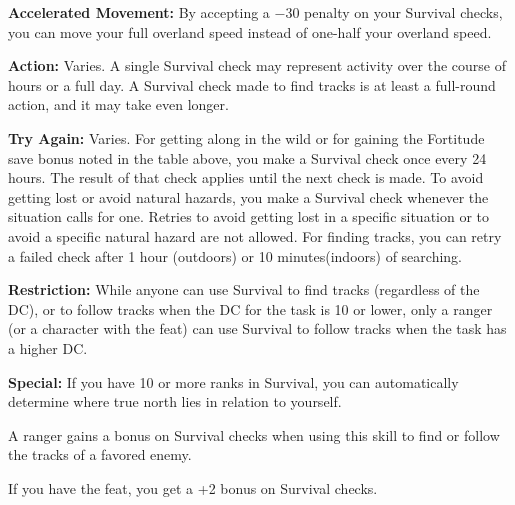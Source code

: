 
\textbf{Accelerated Movement:} By accepting a $-30$ penalty on your Survival checks, you can move your full overland speed instead of one-half your overland speed.

\textbf{Action:} Varies. A single Survival check may represent activity over the course of hours or a full day. A Survival check made to find tracks is at least a full-round action, and it may take even longer.

\textbf{Try Again:} Varies. For getting along in the wild or for gaining the Fortitude save bonus noted in the table above, you make a Survival check once every 24 hours. The result of that check applies until the next check is made. To avoid getting lost or avoid natural hazards, you make a Survival check whenever the situation calls for one. Retries to avoid getting lost in a specific situation or to avoid a specific natural hazard are not allowed. For finding tracks, you can retry a failed check after 1 hour (outdoors) or 10 minutes(indoors) of searching.

\textbf{Restriction:} While anyone can use Survival to find tracks (regardless of the DC), or to follow tracks when the DC for the task is 10 or lower, only a ranger (or a character with the  feat) can use Survival to follow tracks when the task has a higher DC.

\textbf{Special:} If you have 10 or more ranks in Survival, you can automatically determine where true north lies in relation to yourself.

A ranger gains a bonus on Survival checks when using this skill to find or follow the tracks of a favored enemy.

If you have the  feat, you get a +2 bonus on Survival checks.

